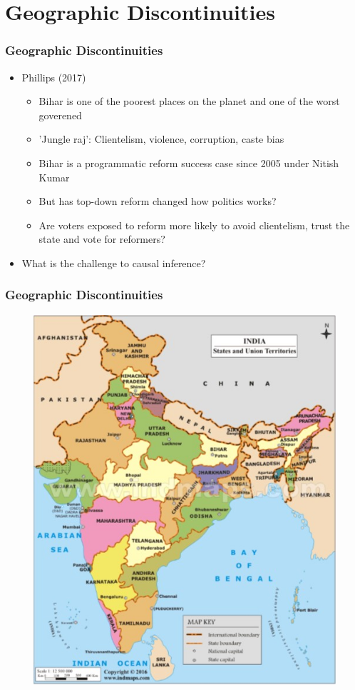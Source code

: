 \documentclass[xcolor=x11names,compress]{beamer}\usepackage[]{graphicx}\usepackage[]{color}
\renewcommand{\(}{\begin{columns}}
\renewcommand{\)}{\end{columns}}
\newcommand{\<}[1]{\begin{column}{#1}}
\renewcommand{\>}{\end{column}}
\begin{document}
\section{Geographic Discontinuities}

\begin{frame}
\frametitle{Geographic Discontinuities}
\begin{itemize}
\item Phillips (2017)
\pause
\begin{itemize}
\item Bihar is one of the poorest places on the planet and one of the worst goverened
\pause
\item 'Jungle raj': Clientelism, violence, corruption, caste bias
\pause
\item Bihar is a programmatic reform success case since 2005 under Nitish Kumar
\pause
\item But has top-down reform changed how politics works?
\pause
\item Are voters exposed to reform more likely to avoid clientelism, trust the state and vote for reformers?
\end{itemize}
\pause
\item What is the challenge to causal inference? 
\end{itemize}
\end{frame}

\begin{frame}
\frametitle{Geographic Discontinuities}
\begin{figure}
\includegraphics[scale=0.2]{figure/India_Map.jpg} 
\end{figure}
\end{frame}
\end{document}
